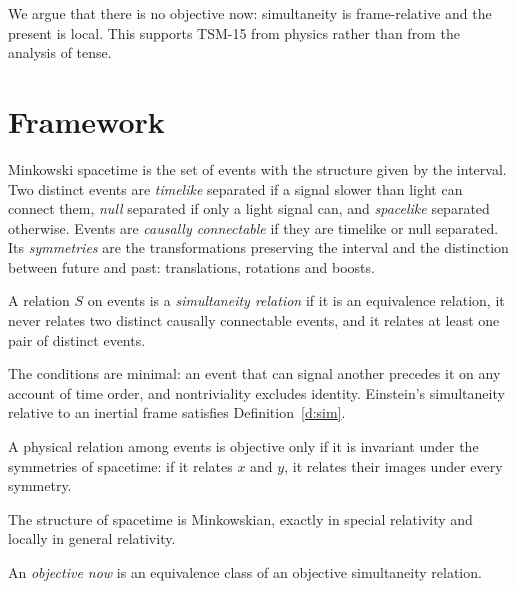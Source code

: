 \documentclass{situationist-preprint}
\begin{document}
We argue that there is no objective now: simultaneity is frame-relative and the present is local. This supports TSM-15 from physics rather than from the analysis of tense.

\section{Framework}

\begin{definition}\label{d:mink}
Minkowski spacetime is the set of events with the structure given by the interval. Two distinct events are \emph{timelike} separated if a signal slower than light can connect them, \emph{null} separated if only a light signal can, and \emph{spacelike} separated otherwise. Events are \emph{causally connectable} if they are timelike or null separated. Its \emph{symmetries} are the transformations preserving the interval and the distinction between future and past: translations, rotations and boosts.
\end{definition}

\begin{definition}\label{d:sim}
A relation $S$ on events is a \emph{simultaneity relation} if it is an equivalence relation, it never relates two distinct causally connectable events, and it relates at least one pair of distinct events.
\end{definition}

The conditions are minimal: an event that can signal another precedes it on any account of time order, and nontriviality excludes identity. Einstein's simultaneity relative to an inertial frame satisfies Definition~\ref{d:sim}.

\begin{principle}\label{p:inv}
A physical relation among events is objective only if it is invariant under the symmetries of spacetime: if it relates $x$ and $y$, it relates their images under every symmetry.
\end{principle}

\begin{assumption}\label{a:rel}
The structure of spacetime is Minkowskian, exactly in special relativity and locally in general relativity.
\end{assumption}

\begin{definition}\label{d:now}
An \emph{objective now} is an equivalence class of an objective simultaneity relation.
\end{definition}
\end{document}
